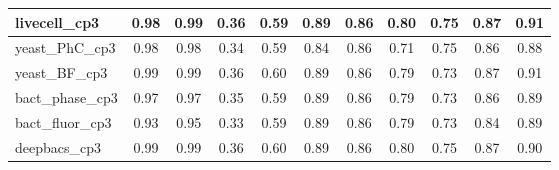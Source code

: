 \documentclass[./dissertation.tex]{subfiles}
\begin{document}
\begin{table}[!ht]
\begin{tabular}{|l|c|c|c|c|c|c|c|c|c|c|}
    livecell\_cp3             & 0.98                                 & 0.99                                  & 0.36                                   & 0.59                                    & 0.89                                   & 0.86                                     & 0.80                                    & 0.75                                    & 0.87                                   & 0.91                                  \\ \hline
    yeast\_PhC\_cp3           & 0.98                                 & 0.98                                  & 0.34                                   & 0.59                                    & 0.84                                   & 0.86                                     & 0.71                                    & 0.75                                    & 0.86                                   & 0.88                                  \\ \hline
    yeast\_BF\_cp3            & 0.99                                 & 0.99                                  & 0.36                                   & 0.60                                    & 0.89                                   & 0.86                                     & 0.79                                    & 0.73                                    & 0.87                                   & 0.91                                  \\ \hline
    bact\_phase\_cp3          & 0.97                                 & 0.97                                  & 0.35                                   & 0.59                                    & 0.89                                   & 0.86                                     & 0.79                                    & 0.73                                    & 0.86                                   & 0.89                                  \\ \hline
    bact\_fluor\_cp3          & 0.93                                 & 0.95                                  & 0.33                                   & 0.59                                    & 0.89                                   & 0.86                                     & 0.79                                    & 0.73                                    & 0.84                                   & 0.89                                  \\ \hline
    deepbacs\_cp3             & 0.99                                 & 0.99                                  & 0.36                                   & 0.60                                    & 0.89                                   & 0.86                                     & 0.80                                    & 0.75                                    & 0.87                                   & 0.90                                  \\ \hline

\end{tabular}
\end{table}
\end{document}
